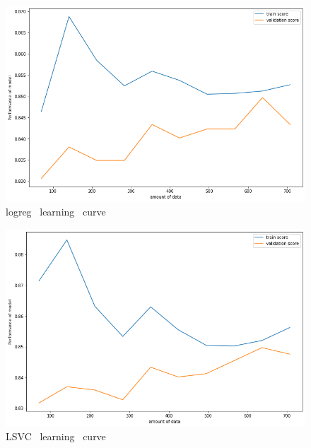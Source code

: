 \documentclass[12pt]{article}
\begin{document}
\begin{figure}[H]
\begin{center}
\includegraphics[scale=0.6]{learning_curve_2.png} 
\caption[]{ logreg \ learning \ curve }
\end{center}
\end{figure}

\begin{figure}[H]
\begin{center}
\includegraphics[scale=0.6]{learning_curve_3.png} 
\caption[]{ LSVC \ learning \ curve }
\end{center}
\end{figure}
\end{document}
